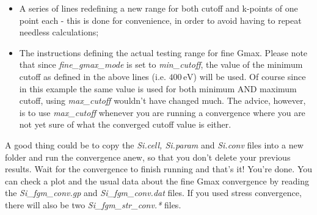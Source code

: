 \documentclass[10pt]{article}
\begin{document}
\begin{itemize}
 \item A series of lines redefining a new range for both cutoff and k-points of one point each - this is done for convenience, in order to avoid having to repeat needless calculations;
 \item The instructions defining the actual testing range for fine Gmax. Please note that since \textit{fine\_gmax\_mode} is set to \textit{min\_cutoff}, the value of the minimum cutoff as defined in the above lines (i.e. $400\,\mathrm{eV}$) will be used. Of course since in this example the same value is used for both minimum AND maximum cutoff, using \textit{max\_cutoff} wouldn't have changed much. The advice, however, is to use \textit{max\_cutoff} whenever you are running a convergence where you are not yet sure of what the converged cutoff value is either.
\end{itemize}

A good thing could be to copy the \textit{Si.cell, Si.param} and \textit{Si.conv} files into a new folder and run the convergence anew, so that you don't delete your previous results. Wait for the convergence to finish running and that's it! You're done. You can check a plot and the usual data about the fine Gmax convergence by reading the \textit{Si\_fgm\_conv.gp} and \textit{Si\_fgm\_conv.dat} files. If you used stress convergence, there will also be two \textit{Si\_fgm\_str\_conv.*} files.
\end{document}
